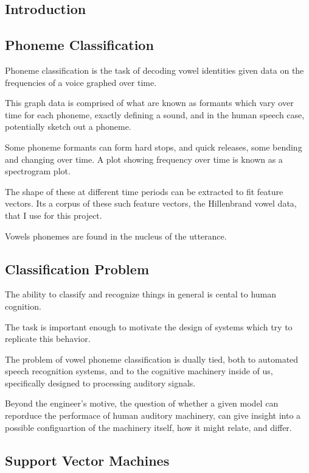 \documentclass[twoside]{article}
\begin{document}
\begin{multicols}{2}

\tableofcontents

\section{Introduction}

\subsection{Phoneme Classification}

Phoneme classification is the task of decoding vowel identities given data on the frequencies of a voice graphed over time.

This graph data is comprised of what are known as formants which vary over time for each phoneme, exactly defining a sound, and in the human speech case, potentially sketch out a phoneme.

Some phoneme formants can form hard stops, and quick releases, some bending and changing over time. A plot showing frequency over time is known as a spectrogram plot.

The shape of these at different time periods can be extracted to fit feature vectors.  Its a corpus of these such feature vectors, the Hillenbrand vowel data, that I use for this project.

Vowels phonemes are found in the nucleus of the utterance.

\subsection{Classification Problem}

The ability to classify and recognize things in general is cental to human cognition.

The task is important enough to  motivate the design of systems which try to replicate this behavior.

The problem of vowel phoneme classification is dually tied, both to automated speech recognition systems, and to the cognitive machinery inside of us, specifically designed to processing auditory signals.

Beyond the engineer's motive, the question of whether a given model can reporduce the performace of human auditory machinery, can give insight into a possible configuartion of the machinery itself, how it might relate, and differ.

\subsection{Support Vector Machines}


\end{multicols}
\end{document}
